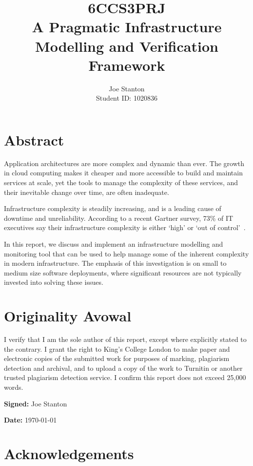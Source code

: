 \documentclass{cshonours}
\title{6CCS3PRJ \\\vspace{0.5cm}
  A Pragmatic Infrastructure Modelling and Verification Framework}
\author{Joe Stanton\\\vspace{0.5cm}
  Student ID: 1020836
}
\begin{document}
\maketitle

\chapter*{Abstract}



Application architectures are more complex and dynamic than ever. The growth in cloud computing makes it cheaper and more accessible to build and maintain services at scale, yet the tools to manage the complexity of these services, and their inevitable change over time, are often inadequate.

 Infrastructure complexity is steadily increasing, and is a leading cause of downtime and unreliability. According to a recent Gartner survey, 73\% of IT executives say their infrastructure complexity is either `high' or `out of control'~\cite{Gartner2013}.

In this report, we discuss and implement an infrastructure modelling and monitoring tool that can be used to help manage some of the inherent complexity in modern infrastructure. The emphasis of this investigation is on small to medium size software deployments, where significant resources are not typically invested into solving these issues.

\chapter*{Originality Avowal}
I verify that I am the sole author of this report, except where explicitly stated to the contrary. I grant the right to King’s College London to make paper and electronic copies of the submitted work for purposes of marking, plagiarism detection and archival, and to upload a copy of the work to Turnitin or another trusted plagiarism detection service. I confirm this report does not exceed 25,000 words.

\textbf{Signed:} Joe Stanton 

\textbf{Date:} \today

\chapter*{Acknowledgements}
\end{document}
